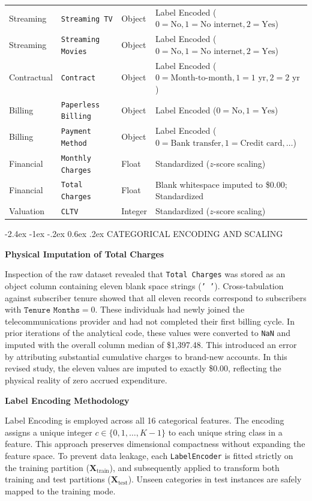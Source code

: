 \documentclass[12pt,oneside]{report}
\makeatletter
\renewcommand{\section}{\@startsection{section}{1}{\z@}%
  {-2.4ex \@plus -1ex \@minus -.2ex}%
  {0.6ex \@plus .2ex}%
  {\normalfont\large\bfseries}}
\makeatother
\begin{document}
\begin{table}[H]
\begin{tabular}{llll}
Streaming & \texttt{Streaming TV} & Object & Label Encoded ($0 = \text{No}, 1 = \text{No internet}, 2 = \text{Yes}$) \\
Streaming & \texttt{Streaming Movies} & Object & Label Encoded ($0 = \text{No}, 1 = \text{No internet}, 2 = \text{Yes}$) \\
Contractual & \texttt{Contract} & Object & Label Encoded ($0 = \text{Month-to-month}, 1 = \text{1 yr}, 2 = \text{2 yr}$) \\
Billing & \texttt{Paperless Billing} & Object & Label Encoded ($0 = \text{No}, 1 = \text{Yes}$) \\
Billing & \texttt{Payment Method} & Object & Label Encoded ($0 = \text{Bank transfer}, 1 = \text{Credit card}, \dots$) \\
Financial & \texttt{Monthly Charges} & Float & Standardized ($z$-score scaling) \\
Financial & \texttt{Total Charges} & Float & Blank whitespace imputed to \$0.00; Standardized \\
Valuation & \texttt{CLTV} & Integer & Standardized ($z$-score scaling) \\
\bottomrule
\end{tabular}
\end{table}

\section{CATEGORICAL ENCODING AND SCALING}

\textbf{Physical Imputation of Total Charges}

Inspection of the raw dataset revealed that \texttt{Total Charges} was stored as an object column containing eleven blank space strings (\texttt{' '}). Cross-tabulation against subscriber tenure showed that all eleven records correspond to subscribers with $\texttt{Tenure Months} = 0$. These individuals had newly joined the telecommunications provider and had not completed their first billing cycle. In prior iterations of the analytical code, these values were converted to \texttt{NaN} and imputed with the overall column median of \$1,397.48. This introduced an error by attributing substantial cumulative charges to brand-new accounts. In this revised study, the eleven values are imputed to exactly \$0.00, reflecting the physical reality of zero accrued expenditure.

\textbf{Label Encoding Methodology}

Label Encoding is employed across all 16 categorical features. The encoding assigns a unique integer $c \in \{0, 1, \dots, K-1\}$ to each unique string class in a feature. This approach preserves dimensional compactness without expanding the feature space. To prevent data leakage, each \texttt{LabelEncoder} is fitted strictly on the training partition ($\mathbf{X}_{\text{train}}$), and subsequently applied to transform both training and test partitions ($\mathbf{X}_{\text{test}}$). Unseen categories in test instances are safely mapped to the training mode.
\end{document}
